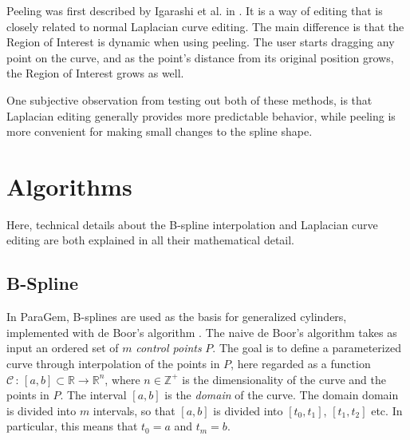 \documentclass[english]{article}
\begin{document}
Peeling was first described by Igarashi et al. in \cite{rigid_igarashi}. It is a way of editing that is closely related to normal Laplacian curve editing. The main difference is that the Region of Interest is dynamic when using peeling. The user starts dragging any point on the curve, and as the point's distance from its original position grows, the Region of Interest grows as well.

One subjective observation from testing out both of these methods, is that Laplacian editing generally provides more predictable behavior, while peeling is more convenient for making small changes to the spline shape.




\pagebreak

\section{Algorithms} \label{section_algorithms}

Here, technical details about the B-spline interpolation and Laplacian curve editing are both explained in all their mathematical detail.

\subsection{B-Spline} \label{section_b_spline}


In ParaGem, B-splines are used as the basis for generalized cylinders, implemented with de Boor's algorithm \cite{deboor}. The naive de Boor's algorithm takes as input an ordered set of $m$ \textit{control points} $P$. The goal is to define a parameterized curve through interpolation of the points in $P$, here regarded as a function $\mathcal{C} \, : \, [a, b] \subset \mathbb{R} \rightarrow \mathbb{R}^n$, where $n \in \mathbb{Z^+}$ is the dimensionality of the curve and the points in $P$. The interval $[a, b]$ is the \textit{domain} of the curve. The domain domain is divided into $m$ intervals, so that $[a, b]$ is divided into $[t_0, t_1]$, $[t_1, t_2]$ etc. In particular, this means that $t_0 = a$ and $t_m = b$.
\end{document}
